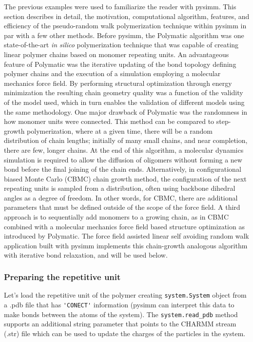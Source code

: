 \documentclass[9pt,tutorial]{livecoms}
\begin{document}
The previous examples were used to familiarize the reader with pysimm. This section describes in detail, the motivation, computational algorithm, features, and efficiency of the pseudo-random walk polymerization technique within pysimm in par with a few other methods. Before pysimm, the Polymatic algorithm \cite{pmatic} was one state-of-the-art \textit{in silico} polymerization technique that was capable of creating linear polymer chains based on monomer repeating units. An advantageous feature of Polymatic was the iterative updating of the bond topology defining polymer chains and the execution of a simulation employing a molecular mechanics force field. By performing structural optimization through energy minimization the resulting chain geometry quality was a function of the validity of the model used, which in turn enables the validation of different models using the same methodology. One major drawback of Polymatic was the randomness in how monomer units were connected. This method can be compared to step-growth polymerization, where at a given time, there will be a random distribution of chain lengths; initially of many small chains, and near completion, there are few, longer chains. At the end of this algorithm, a molecular dynamics simulation is required to allow the diffusion of oligomers without forming a new bond before the final joining of the chain ends. Alternatively, in configurational biased Monte Carlo (CBMC) \cite{cbmc_orig, cbmc_theodoru1} chain growth method, the configuration of the next repeating units is sampled from a distribution, often using backbone dihedral angles as a degree of freedom. In other words, for CBMC, there are additional parameters that must be defined outside of the scope of the force field.  A third approach is to sequentially add monomers to a growing chain, as in CBMC combined with a molecular mechanics force field based structure optimization as introduced by Polymatic. The force field assisted linear self avoiding random walk application built with pysimm implements this chain-growth analogous algorithm with iterative bond relaxation, and will be used below.



\subsubsection{Preparing the repetitive unit}

Let's load the repetitive unit of the polymer creating \lstinline$system.System$ object from a .pdb file that has \lstinline$'CONECT'$ information (pysimm can interpret this data to make bonds between the atoms of the system). The \lstinline$system.read_pdb$ method supports an additional string parameter that points to the CHARMM stream (.str) file which can be used to update the charges of the particles in the system.
\end{document}
